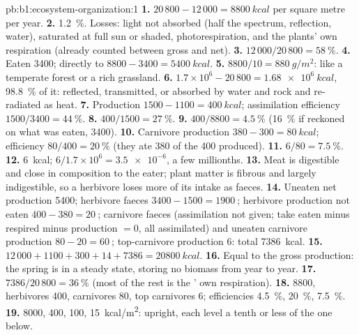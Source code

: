 \begin{solution}{pb:b1:ecosystem-organization:1}
\textbf{1.} $20\,800 - 12\,000 = \qty{8800}{kcal}$ per square metre per
year.
\textbf{2.} \qty{1.2}{\%}. Losses: light not absorbed (half the
spectrum, reflection, water),  saturated at full sun or shaded,
photorespiration, and the plants' own respiration (already counted
between gross and net).
\textbf{3.} $12\,000/20\,800 = \qty{58}{\%}$.
\textbf{4.} Eaten \qty{3400}{}; directly to 
$8800 - 3400 = \qty{5400}{kcal}$.
\textbf{5.} $8800/10 = \qty{880}{g/m^2}$: like a temperate forest or a
rich grassland.
\textbf{6.} $1.7\times 10^6 - 20\,800 = \qty{1.68e6}{kcal}$, \qty{98.8}{\%}
of it: reflected, transmitted, or absorbed by water and rock and
re-radiated as heat.
\textbf{7.} Production $1500 - 1100 = \qty{400}{kcal}$; assimilation
efficiency $1500/3400 = \qty{44}{\%}$.
\textbf{8.} $400/1500 = \qty{27}{\%}$.
\textbf{9.} $400/8800 = \qty{4.5}{\%}$ (\qty{16}{\%} if reckoned on what
was eaten, \qty{3400}{}).
\textbf{10.} Carnivore production $380 - 300 = \qty{80}{kcal}$;
efficiency $80/400 = \qty{20}{\%}$ (they ate \qty{380}{} of the
\qty{400}{} produced).
\textbf{11.} $6/80 = \qty{7.5}{\%}$.
\textbf{12.} \qty{6}{kcal}; $6/1.7\times 10^6 = \num{3.5e-6}$, a few
millionths.
\textbf{13.} Meat is digestible and close in composition to the eater;
plant matter is fibrous and largely indigestible, so a herbivore
loses more of its intake as faeces.
\textbf{14.} Uneaten net production \qty{5400}{}; herbivore faeces
$3400 - 1500 = \qty{1900}{}$; herbivore production not eaten
$400 - 380 = \qty{20}{}$; carnivore faeces (assimilation not given;
take eaten minus respired minus production $= 0$, all assimilated)
and uneaten carnivore production $80 - 20 = \qty{60}{}$; top-carnivore
production \qty{6}{}: total \qty{7386}{kcal}.
\textbf{15.} $12\,000 + 1100 + 300 + 14 + 7386 = \qty{20800}{kcal}$.
\textbf{16.} Equal to the gross production: the spring is in a steady
state, storing no biomass from year to year.
\textbf{17.} $7386/20\,800 = \qty{36}{\%}$ (most of the rest is the
' own respiration).
\textbf{18.}  \qty{8800}{}, herbivores \qty{400}{}, carnivores
\qty{80}{}, top carnivores \qty{6}{}; efficiencies \qty{4.5}{\%},
\qty{20}{\%}, \qty{7.5}{\%}.
\textbf{19.} \qty{8000}{}, \qty{400}{}, \qty{100}{}, \qty{15}{kcal/m^2}:
upright, each level a tenth or less of the one below.

\end{solution}
